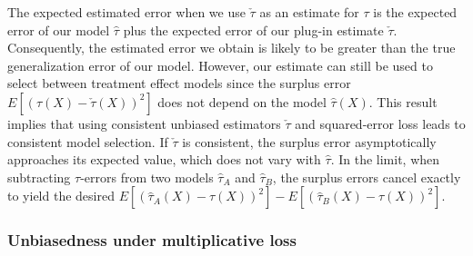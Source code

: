 The expected estimated error when we use $\check\tau$ as an estimate for $\tau$ is the expected error of our model $\hat\tau$ plus the expected error of our plug-in estimate $\check\tau$. Consequently, the estimated error we obtain is likely to be greater than the true generalization error of our model. However, our estimate can still be used to select between treatment effect models since the surplus error $E[(\tau(X) - \check\tau(X))^2]$ does not depend on the model $\hat \tau(X)$. This result implies that using consistent unbiased estimators $\check\tau$ and squared-error loss leads to consistent model selection. If $\check\tau$ is consistent, the surplus error asymptotically approaches its expected value, which does not vary with $\hat\tau$. In the limit, when subtracting $\tau$-errors from two models $\hat\tau_A$ and $\hat\tau_B$, the surplus errors cancel exactly to yield the desired $E[ (\hat \tau_A(X) - \tau(X))^2] - E[ (\hat \tau_B(X) - \tau(X))^2]$.

\begin{comment}
    \begin{theorem}
    If $\check\tau_i$ is unbiased and consistent for $\tau_i$, then $\underset{m}{\emph{argmin}}\frac{1}{|\mathcal{V}|}\sum_{i \in \mathcal{V}}^{|\mathcal{V}|}  (\hat \tau_m(x_i) - \check \tau_i)^2$ is a consistent estimator of $\underset{m}{\emph{argmin}} \ E[(\hat\tau_m(X) - \tau(X))^2]$.
    \end{theorem}
    
    \begin{proof}
    
    ($^*$waves hands$^*$) The value of the estimated error for a model $\hat\tau_m$ is $\check e_m = \frac{1}{|\mathcal{V}|}\sum_{i \in \mathcal{V}}^{|\mathcal{V}|}  (\hat \tau_m(x_i) - \check \tau_i)^2 $. As $n$ goes to infinity, this should converge in probability to its expected value, which is a constant $e_m + d$, where $e_m$ is the true generalization error $E[(\tau(X) - \hat\tau(X))^2]$ and $d=E[(\tau(X) - \check\tau(X))^2]$ is a constant that doesn't depend on the model. We compare two models $\hat\tau_A$ and $\hat\tau_B$ on the basis of their estimated error $\check e_A$ and $\check e_B$. In the limit, $\check e_A > \check e_B \iff  e_A + d >  e_B + d \iff  e_A >  e_B$ ($^*$waves hands$^*$) 
    
    \end{proof}
\end{comment}

\subsubsection{Unbiasedness under multiplicative loss}

